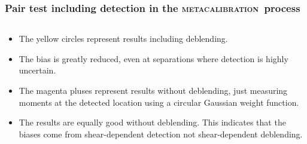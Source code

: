 \documentclass{beamer}
\newcommand{\mcal}{\textsc{metacalibration}}
\begin{document}
\begin{frame}
    \frametitle{Pair test including detection in the \mcal\ process}

 
    \begin{columns}
        \begin{column}{0.5\textwidth}
            \begin{itemize}

                \item The yellow circles represent results including deblending.

                \item The bias is greatly reduced, even at separations where
                    detection is highly uncertain.

                \item The magenta pluses represent results without deblending, just
                    measuring moments at the detected location using a circular
                    Gaussian weight function.

                \item The results are {\color{lightsteelblue} equally good
                    without deblending}.  This indicates that the biases come
                    from shear-dependent detection  not shear-dependent
                    deblending.


\end{itemize}
\end{column}
\end{columns}
\end{frame}
\end{document}
